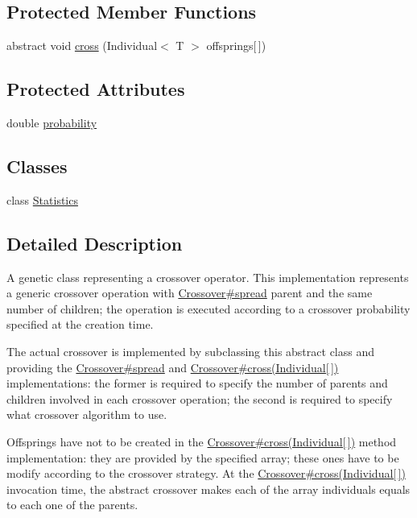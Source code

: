 \subsection*{Protected Member Functions}
\begin{CompactItemize}
\item 
abstract void \hyperlink{classjenes_1_1stage_1_1operator_1_1_crossover_3_01_t_01extends_01_chromosome_01_4_c47e22fb5a73617bde7a1131da5be161}{cross} (Individual$<$ T $>$ offsprings\mbox{[}$\,$\mbox{]})
\end{CompactItemize}
\subsection*{Protected Attributes}
\begin{CompactItemize}
\item 
double \hyperlink{classjenes_1_1stage_1_1operator_1_1_crossover_3_01_t_01extends_01_chromosome_01_4_2b4aec7312a223ba84862f7848b14542}{probability}
\end{CompactItemize}
\subsection*{Classes}
\begin{CompactItemize}
\item 
class \hyperlink{classjenes_1_1stage_1_1operator_1_1_crossover_3_01_t_01extends_01_chromosome_01_4_1_1_statistics}{Statistics}
\end{CompactItemize}


\subsection{Detailed Description}
A genetic class representing a crossover operator. This implementation represents a generic crossover operation with \hyperlink{}{Crossover\#spread} parent and the same number of children; the operation is executed according to a crossover probability specified at the creation time. 

The actual crossover is implemented by subclassing this abstract class and providing the \hyperlink{}{Crossover\#spread} and \hyperlink{}{Crossover\#cross(Individual\mbox{[}$\,$\mbox{]})} implementations: the former is required to specify the number of parents and children involved in each crossover operation; the second is required to specify what crossover algorithm to use. 

Offsprings have not to be created in the \hyperlink{}{Crossover\#cross(Individual\mbox{[}$\,$\mbox{]})} method implementation: they are provided by the specified array; these ones have to be modify according to the crossover strategy. At the \hyperlink{}{Crossover\#cross(Individual\mbox{[}$\,$\mbox{]})} invocation time, the abstract crossover makes each of the array individuals equals to each one of the parents. 

